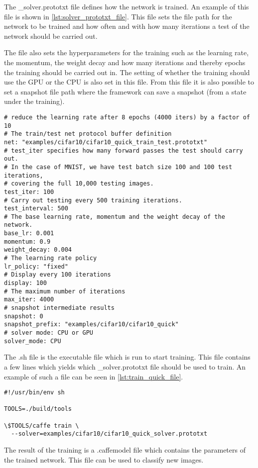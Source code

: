 The \_solver.prototxt file defines how the network is trained. An example of this file is shown in \autoref{lst:solver_prototxt_file}. This file sets the file path for the network to be trained and how often and with how many iterations a test of the network should be carried out.

The file also sets the hyperparameters for the training such as the learning
rate, the momentum, the weight decay and how many iterations and thereby epochs the training should be carried out in. The setting of whether the training should use the GPU or the CPU is also set in this file. From this file it is also possible to set a snapshot file path where the framework can save a snapshot (from a state under the training).

\begin{lstlisting}[caption = The code from the cifar10\_quick\_solver.prototxt from  the Cifar-10 tutorial provided by the framework. This file defines the hyperparameters for the training of the network., label={lst:solver_prototxt_file}]
# reduce the learning rate after 8 epochs (4000 iters) by a factor of 10
# The train/test net protocol buffer definition
net: "examples/cifar10/cifar10_quick_train_test.prototxt"
# test_iter specifies how many forward passes the test should carry out.
# In the case of MNIST, we have test batch size 100 and 100 test iterations,
# covering the full 10,000 testing images.
test_iter: 100
# Carry out testing every 500 training iterations.
test_interval: 500
# The base learning rate, momentum and the weight decay of the network.
base_lr: 0.001
momentum: 0.9
weight_decay: 0.004
# The learning rate policy
lr_policy: "fixed"
# Display every 100 iterations
display: 100
# The maximum number of iterations
max_iter: 4000
# snapshot intermediate results
snapshot: 0
snapshot_prefix: "examples/cifar10/cifar10_quick"
# solver mode: CPU or GPU
solver_mode: CPU
\end{lstlisting}

The .sh file is the executable file which is run to start training. This file contains a few lines which yields which \_solver.prototxt file should be used to train. An example of such a file can be seen in \autoref{lst:train_quick_file}.

\begin{lstlisting}[caption = The code from the train\_quick.sh file from  the Cifar-10 tutorial provided by the framework. This file is executable and yields which \_solver.prototxt file to us to start training., label={lst:train_quick_file}]
#!/usr/bin/env sh

TOOLS=./build/tools

\$TOOLS/caffe train \
  --solver=examples/cifar10/cifar10_quick_solver.prototxt
\end{lstlisting}

The result of the training is a .caffemodel file which contains the parameters of the trained network. This file can be used to classify new images.


